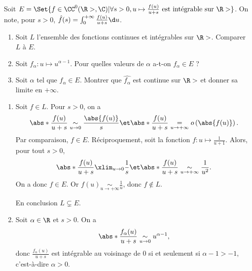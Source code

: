 \begin{enonce}
\begin{exercise}[ID={RMS 120/683 Mines-Ponts PC},subtitle={},tags={}, difficulty={0}]
Soit $E=\Set{f\in\CC^0(\R>,\C) | \forall s>0, u\mapsto \frac{f(u)}{u+s} \text{ est intégrable sur }\R>}$.
    On note, pour $s>0$,
$\hat f(s)=\int_0^{+\infty} \frac{f(u)}{u+s}\d u$.

\begin{enumerate}
\item Soit $L$ l'ensemble des fonctions continues et intégrables sur $\R>$. Comparer $L$ à $E$.
\item Soit $f_\alpha:u\mapsto u^{\alpha-1}$. Pour quelles valeurs de $\alpha$ a-t-on $f_\alpha\in E$ ?
\item Soit $\alpha$ tel que $f_\alpha\in E$. Montrer que $\hat{f_\alpha}$ est continue sur $\R>$ et donner sa limite en $+\infty$.
\end{enumerate}
\end{exercise}
\begin{solution}
\begin{enumerate}
\item Soit $f\in L$.
Pour $s>0$, on a
\begin{equation*}
    \abs*{\frac{f(u)}{u+s}}\underset{u\to 0}\sim \frac{\abs{f(u)}}{s}
    \et
    \abs*{\frac{f(u)}{u+s}}\underset{u\to +\infty}= o\left(\abs{f(u)}\right).
\end{equation*}
Par comparaison, $f\in E$.
Réciproquement, soit la fonction $f:u\mapsto \frac{1}{u+1}$. Alors, pour tout $s>0$,
\begin{equation*}
    \abs*{\frac{f(u)}{u+s}}\xlim_{u\to 0} \frac1s
    \et
    \abs*{\frac{f(u)}{u+s}}\underset{u\to +\infty}\sim \frac{1}{u^2}.
\end{equation*}
On a donc $f\in E$. Or $f(u)\underset{u\to+\infty}\sim \frac1u$, donc $f\notin L$.

En conclusion $\boxed{L\subsetneq E}$.


\item Soit $\alpha\in\R$ et $s>0$. On a
\begin{equation*}
    \abs*{\frac{f_\alpha(u)}{u+s}}\underset{u\to 0}\sim u^{\alpha-1},
\end{equation*}
donc $\frac{f_\alpha(u)}{u+s}$ est intégrable au voisinage de $0$ si et seulement si $\alpha-1>-1$, c'est-à-dire $\alpha>0$.


\end{enumerate}
\end{solution}
\end{enonce}
